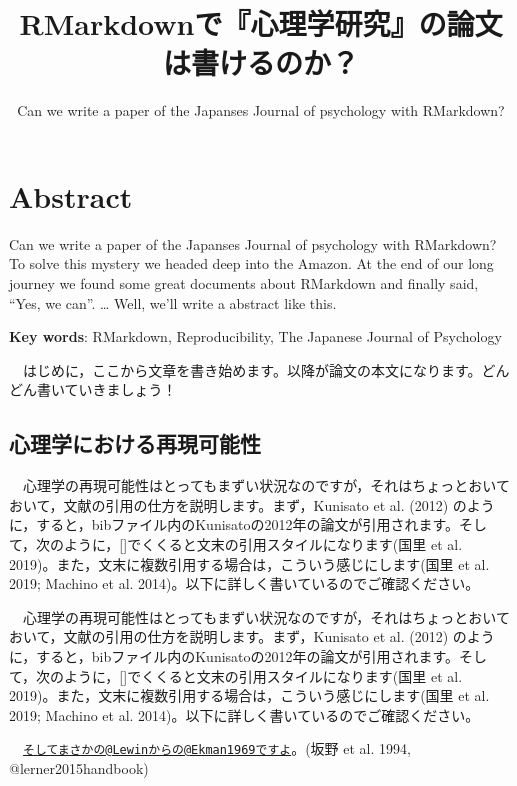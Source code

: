 \documentclass[11pt,a4paper,xelatex,ja=standard]{bxjsarticle}
\title{RMarkdownで『心理学研究』の論文は書けるのか？}
\subtitle{Can we write a paper of the Japanses Journal of psychology with
RMarkdown?}
\author{}
\date{}
\begin{document}
\pagestyle{empty}
\maketitle
\pagestyle{plain}
\setcounter{page}{1}

\hypertarget{abstract}{%
\section{Abstract}\label{abstract}}

Can we write a paper of the Japanses Journal of psychology with
RMarkdown? To solve this mystery we headed deep into the Amazon. At the
end of our long journey we found some great documents about RMarkdown
and finally said, ``Yes, we can''. \ldots{} Well, we'll write a abstract
like this.

\textbf{Key words}: RMarkdown, Reproducibility, The Japanese Journal of
Psychology

\clearpage

　はじめに，ここから文章を書き始めます。以降が論文の本文になります。どんどん書いていきましょう！

\hypertarget{ux5fc3ux7406ux5b66ux306bux304aux3051ux308bux518dux73feux53efux80fdux6027}{%
\subsection{心理学における再現可能性}\label{ux5fc3ux7406ux5b66ux306bux304aux3051ux308bux518dux73feux53efux80fdux6027}}

　心理学の再現可能性はとってもまずい状況なのですが，それはちょっとおいておいて，文献の引用の仕方を説明します。まず，Kunisato
et al. (2012)
のように，すると，bibファイル内のKunisatoの2012年の論文が引用されます。そして，次のように，{[}{]}でくくると文末の引用スタイルになります(国里
et al. 2019)。また，文末に複数引用する場合は，こういう感じにします(国里
et al. 2019; Machino et al.
2014)。以下に詳しく書いているのでご確認ください。

　心理学の再現可能性はとってもまずい状況なのですが，それはちょっとおいておいて，文献の引用の仕方を説明します。まず，Kunisato
et al. (2012)
のように，すると，bibファイル内のKunisatoの2012年の論文が引用されます。そして，次のように，{[}{]}でくくると文末の引用スタイルになります(国里
et al. 2019)。また，文末に複数引用する場合は，こういう感じにします(国里
et al. 2019; Machino et al.
2014)。以下に詳しく書いているのでご確認ください。 　

　\href{mailto:そしてまさかの@Lewinからの@Ekman1969ですよ}{\nolinkurl{そしてまさかの@Lewinからの@Ekman1969ですよ}}。(坂野
et al. 1994, @lerner2015handbook) 　
\end{document}
